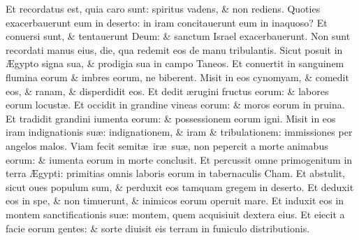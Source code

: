 \documentclass[a5paper,10pt]{book}
\def\ae{æ}
\def\AE{Æ}
\begin{document}
\begin{multicols*}{2}
\newline \color{red} E\color{black}t recordatus est, quia caro sunt: spiritus vadens, \& non rediens.
\newline \color{red} Q\color{black}uoties exacerbauerunt eum in deserto: in iram concitauerunt eum in inaquoso?
\newline \color{red} E\color{black}t conuersi sunt, \& tentauerunt Deum: \& sanctum Israel exacerbauerunt.
\newline \color{red} N\color{black}on sunt recordati manus eius, die, qua redemit eos de manu tribulantis.
\newline \color{red} S\color{black}icut posuit in \AE gypto signa sua, \& prodigia sua in campo Taneos.
\newline \color{red} E\color{black}t conuertit in sanguinem flumina eorum \& imbres eorum, ne biberent.
\newline \color{red} M\color{black}isit in eos cynomyam, \& comedit eos, \& ranam, \& disperdidit eos.
\newline \color{red} E\color{black}t dedit \ae rugini fructus eorum: \& labores eorum locust\ae .
\newline \color{red} E\color{black}t occidit in grandine vineas eorum: \& moros eorum in pruina.
\newline \color{red} E\color{black}t tradidit grandini iumenta eorum: \& possessionem eorum igni.
\newline \color{red} M\color{black}isit in eos iram indignationis su\ae : indignationem, \& iram \& tribulationem: immissiones per angelos malos.
\newline \color{red} V\color{black}iam fecit semit\ae \ ir\ae \ su\ae , non pepercit a morte animabus eorum: \& iumenta eorum in morte conclusit.
\newline \color{red} E\color{black}t percussit omne primogenitum in terra \AE gypti: primitias omnis laboris eorum in tabernaculis Cham.
\newline \color{red} E\color{black}t abstulit, sicut oues populum sum, \& perduxit eos tamquam gregem in deserto.%
\newline \color{red} E\color{black}t deduxit eos in spe, \& non timuerunt, \& inimicos eorum operuit mare.
\newline \color{red} E\color{black}t induxit eos in montem sanctificationis su\ae : montem, quem acquisiuit dextera eius.
\newline \color{red} E\color{black}t eiecit a facie eorum gentes: \& sorte diuisit eis terram in funiculo distributionis.

\end{multicols*}
\end{document}
